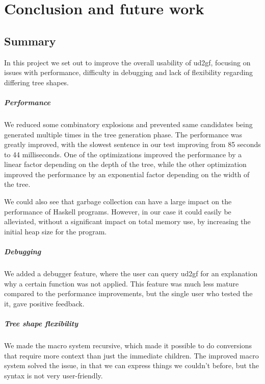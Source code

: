 \chapter{Conclusion and future work}
\section{Summary}

In this project we set out to improve the overall usability of ud2gf, focusing on issues with performance, difficulty in debugging and lack of flexibility regarding differing tree shapes. 

\paragraph*{Performance}
We reduced some combinatory explosions and prevented same candidates being generated multiple times in the tree generation phase. The performance was greatly improved, with the slowest sentence in our test improving from 85 seconds to 44 milliseconds. One of the optimizations improved the performance by a linear factor depending on the depth of the tree, while the other optimization improved the performance by an exponential factor depending on the width of the tree.

We could also see that garbage collection can have a large impact on the performance of Haskell programs. However, in our case it could easily be alleviated, without a significant impact on total memory use, by increasing the initial heap size for the program.

\paragraph*{Debugging}
We added a debugger feature, where the user can query ud2gf for an explanation why a certain function was not applied. This feature was much less mature compared to the performance improvements, but the single user who tested the it, gave positive feedback. 

\paragraph*{Tree shape flexibility}
We made the macro system recursive, which made it possible to do conversions that require more context than just the immediate children. The improved macro system solved the issue, in that we can express things we couldn't before, but the syntax is not very user-friendly.

